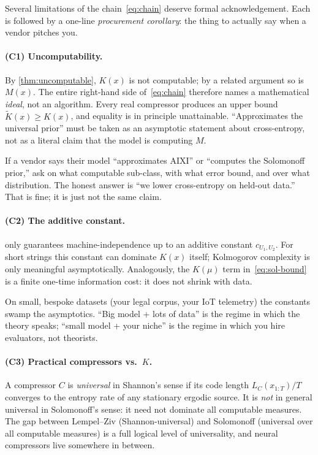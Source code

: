 Several limitations of the chain~\eqref{eq:chain} deserve formal
acknowledgement. Each is followed by a one-line \emph{procurement
corollary}: the thing to actually say when a vendor pitches you.

\paragraph{(C1) Uncomputability.}
By \cref{thm:uncomputable}, $K(x)$ is not computable; by a related
argument so is $M(x)$. The entire right-hand side of~\eqref{eq:chain}
therefore names a mathematical \emph{ideal}, not an algorithm. Every
real compressor produces an upper bound $\tilde K(x) \ge K(x)$, and
equality is in principle unattainable. ``Approximates the universal
prior'' must be taken as an asymptotic statement about cross-entropy,
not as a literal claim that the model is computing $M$.

\begin{procurement}
If a vendor says their model ``approximates AIXI'' or ``computes the
Solomonoff prior,'' ask on what computable sub-class, with what
error bound, and over what distribution. The honest answer is
``we lower cross-entropy on held-out data.'' That is fine; it is
just not the same claim.
\end{procurement}

\paragraph{(C2) The additive constant.}
 only guarantees machine-independence up to an
additive constant $c_{U_1, U_2}$. For short strings this constant
can dominate $K(x)$ itself; Kolmogorov complexity is only meaningful
asymptotically. Analogously, the $K(\mu)$ term
in~\eqref{eq:sol-bound} is a finite one-time information cost: it
does not shrink with data.

\begin{procurement}
On small, bespoke datasets (your legal corpus, your IoT telemetry)
the constants swamp the asymptotics. ``Big model + lots of data''
is the regime in which the theory speaks; ``small model + your
niche'' is the regime in which you hire evaluators, not theorists.
\end{procurement}

\paragraph{(C3) Practical compressors vs.\ $K$.}
A compressor $C$ is \emph{universal} in Shannon's sense if its code
length $L_C(x_{1:T})/T$ converges to the entropy rate of any
stationary ergodic source. It is \emph{not} in general universal in
Solomonoff's sense: it need not dominate all computable measures.
The gap between Lempel--Ziv (Shannon-universal) and Solomonoff
(universal over all computable measures) is a full logical level of
universality, and neural compressors live somewhere in between.

